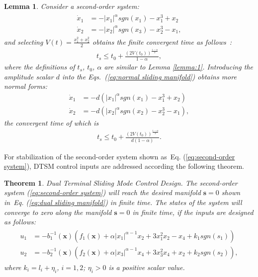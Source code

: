 \documentclass[3p]{elsarticle}
\theoremstyle{plain}
\newtheorem{mylem}{Lemma}
\newtheorem{mythm}{Theorem}
\theoremstyle{remark}
\begin{document}
\begin{mylem}
Consider a second-order system:
\begin{align}
\begin{split}
\dot x_1&=-\vert x_1\vert^\alpha sgn(x_1)-x_1^3+x_2\\
\dot x_2&=-\vert x_2\vert^\alpha sgn(x_3)-x_2^3-x_1,\label{eq:normal sliding manifold}
\end{split}
\end{align}
and selecting $V(t) = \frac{x_1^2+x_2^2}{2}$ obtains the finite convergent time as follows~\cite{moulay2006finite}:
\begin{align}
t_s\le t_0+\frac{(2V(t_0))^{\frac{1-\alpha}{2}}}{1-\alpha},
\end{align}
where the definitions of  $t_s$, $t_0$, $\alpha$ are similar to Lemma \ref{lemma:1}. Introducing the amplitude scalar $d$ into the Eqs.~(\ref{eq:normal sliding manifold}) obtains  more normal forms:
\begin{align}
\dot x_1&=-d(\vert x_1\vert^\alpha sgn(x_1)-x_1^3+x_2)\\
\dot x_2&=-d(\vert x_2\vert^\alpha sgn(x_2)-x_2^3-x_1),\label{eq:more normal sliding manifold}
\end{align}
the convergent time of which is
\begin{align}
t_s\le t_0+\frac{(2V(t_0))^{\frac{1-\alpha}{2}}}{d(1-\alpha)}.
\end{align}\label{lemma:2}
\end{mylem}
For stabilization of the second-order system shown as~Eq. (\ref{eq:second-order system}), DTSM control inputs are addressed according the following theorem.
\begin{mythm}\label{theorem:1}Dual Terminal Sliding Mode Control Design.
The second-order system (\ref{eq:second-order system}) will reach the desired manifold $\bm s = 0$ shown in~Eq. (\ref{eq:dual sliding manifold}) in finite time. The states of the system will converge to zero along the manifold $\bm s=0$ in finite time, if the inputs are designed as follows:
\begin{align}
\begin{split}
u_1 &= -b_1^{-1}(\bm x)(f_1(\bm x)+\alpha\vert x_1\vert^{\alpha-1}x_2+3x_1^2x_2-x_4+k_1sgn(s_1))\\
u_2 &= -b_2^{-1}(\bm x)(f_2(\bm x)+\alpha\vert x_3\vert^{\alpha-1}x_4+3x_3^2x_4+x_2+k_2sgn(s_2)),\label{eq:DSM input}
\end{split}
\end{align}
where $k_i = l_i+\eta_i$, $i=1,2$; $\eta_i>0$ is a positive scalar value.
\end{mythm}
\end{document}
